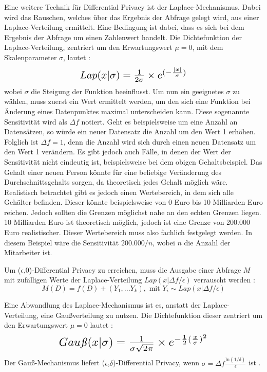 Eine weitere Technik für Differential Privacy ist der Laplace-Mechanismus.
Dabei wird das Rauschen, welches über das Ergebnis der Abfrage gelegt wird, aus einer Laplace-Verteilung ermittelt.
Eine Bedingung ist dabei, dass es sich bei dem Ergebnis der Abfrage um einen Zahlenwert handelt.
Die Dichtefunktion der Laplace-Verteilung, zentriert um den Erwartungswert $\mu=0$, mit dem Skalenparameter $\sigma$, lautet \cite{P-27}:
\begin{equation}
\resizebox{!}{0.55cm}{$
    Lap(x|\sigma) = \frac{1}{2\sigma}\times e^{(-\frac{|x|}{\sigma})}
$}
\end{equation}
wobei $\sigma$ die Steigung der Funktion beeinflusst.
Um nun ein geeignetes $\sigma$ zu wählen, muss zuerst ein Wert ermittelt werden, um den sich eine Funktion bei Änderung eines Datenpunktes maximal unterscheiden kann.
Diese sogenannte Sensitivität wird als $\Delta f$ notiert.
Geht es beispielsweise um eine Anzahl an Datensätzen, so würde ein neuer Datensatz die Anzahl um den Wert 1 erhöhen.
Folglich ist $\Delta f = 1$, denn die Anzahl wird sich durch einen neuen Datensatz um den Wert 1 verändern.
Es gibt jedoch auch Fälle, in denen der Wert der Sensitivität nicht eindeutig ist, beispielsweise bei dem obigen Gehaltsbeispiel.
Das Gehalt einer neuen Person könnte für eine beliebige Veränderung des Durchschnittsgehalts sorgen, da theoretisch jedes Gehalt möglich wäre.
Realistisch betrachtet gibt es jedoch einen Wertebereich, in dem sich alle Gehälter befinden. 
Dieser könnte beispielsweise von 0 Euro bis 10 Milliarden Euro reichen. 
Jedoch sollten die Grenzen möglichst nahe an den echten Grenzen liegen. 
10 Milliarden Euro ist theoretisch möglich, jedoch ist eine Grenze von 200.000 Euro realistischer.
Dieser Wertebereich muss also fachlich festgelegt werden.
In diesem Beispiel wäre die Sensitivität $200.000/n$, wobei $n$ die Anzahl der Mitarbeiter ist.


Um ($\epsilon$,0)-Differential Privacy zu erreichen, muss die Ausgabe einer Abfrage $M$ mit zufälligen Werte der Laplace-Verteilung $Lap(x | \Delta f/\epsilon)$ verrauscht werden \cite{P-27}: 
\begin{equation}
    M(D) = f(D) + (Y_1, ... Y_k),\text{ mit } Y_i \sim Lap(x| \Delta f/\epsilon)
\end{equation}


Eine Abwandlung des Laplace-Mechanismus ist es, anstatt der Laplace-Verteilung, eine Gaußverteilung zu nutzen. Die Dichtefunktion dieser zentriert um den Erwartungswert $\mu=0$ lautet \cite{P-27}:
\begin{equation}\label{formula:gauß}
\resizebox{!}{0.55cm}{$
    Gau\text{\textit{ß}}(x|\sigma) = \frac{1}{\sigma\sqrt{2\pi}}\times e^{-\frac{1}{2}(\frac{x}{\sigma})^2}
$}
\end{equation}
Der Gauß-Mechanismus liefert ($\epsilon$,$\delta$)-Differential Privacy, wenn $\sigma = \Delta f \frac{\text{ln}(1/\delta)}{\epsilon}$ ist \cite{P-27}.

